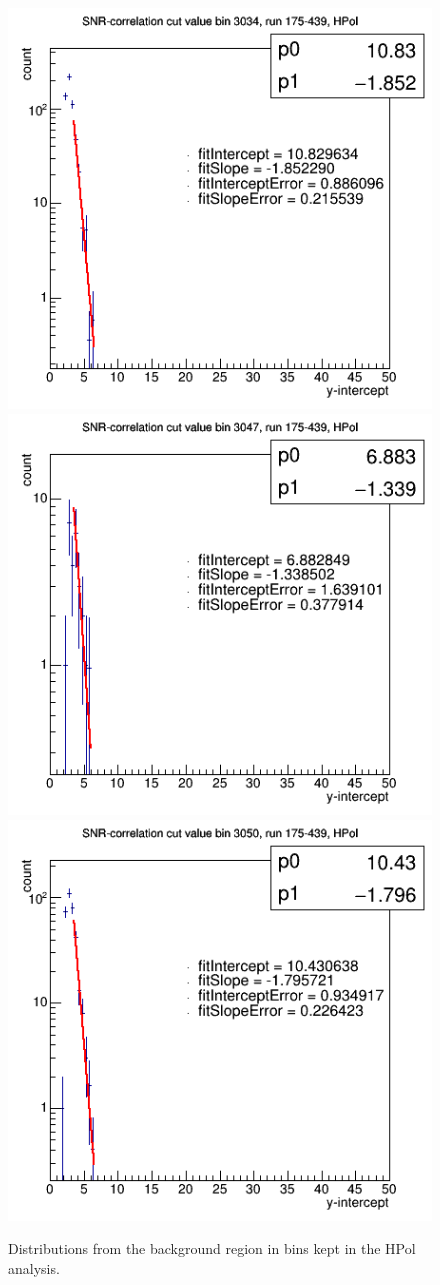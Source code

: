 \begin{figure}
\centering
\includegraphics[width=.5\textwidth]
{figures/cutValHistH03034.png}
\includegraphics[width=.5\textwidth]
{figures/cutValHistH03047.png}
\includegraphics[width=.5\textwidth]
{figures/cutValHistH03050.png}
\caption{Distributions from the background region in bins kept in the HPol analysis.}
\label{hpol_expo}
\end{figure}


